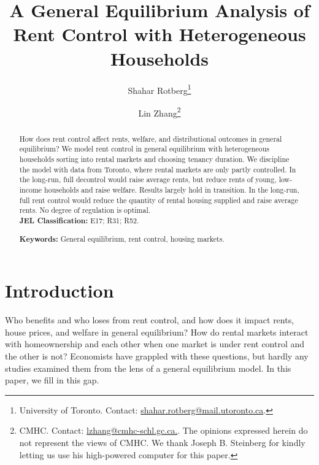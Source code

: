 \documentclass[parskip=full]{article}
\author{Shahar Rotberg\footnote{University of Toronto. Contact: \url{shahar.rotberg@mail.utoronto.ca}.} \and Lin Zhang\footnote{CMHC. Contact: \url{lzhang@cmhc-schl.gc.ca.}. The opinions expressed herein do not represent the views of CMHC. We thank Joseph B. Steinberg for kindly letting us use his high-powered computer for this paper.}
}
\title{\vspace{-1.8cm}A General Equilibrium Analysis of Rent Control with Heterogeneous Households}
\begin{document}
\maketitle

\begin{abstract}
\onehalfspacing
\noindent How does rent control affect rents, welfare, and distributional outcomes in general equilibrium? We model rent control in general equilibrium with heterogeneous households sorting into rental markets and choosing tenancy duration. We discipline the model with data from Toronto, where rental markets are only partly controlled. In the long-run, full decontrol would raise average rents, but reduce rents of young, low-income households and raise welfare. Results largely hold in transition. In the long-run, full rent control would reduce the quantity of rental housing supplied and raise average rents. No degree of regulation is optimal.
\\[1.5ex]

\noindent \textbf{JEL Classification:} E17; R31; R52. 

\noindent \textbf{Keywords:} General equilibrium, rent control, housing markets.
\end{abstract}

\section{Introduction}

Who benefits and who loses from rent control, and how does it impact rents, house prices, and welfare in general equilibrium? How do rental markets interact with homeownership and each other when one market is under rent control and the other is not? Economists have grappled with these questions, but hardly any studies examined them from the lens of a general equilibrium model. In this paper, we fill in this gap.
\end{document}
